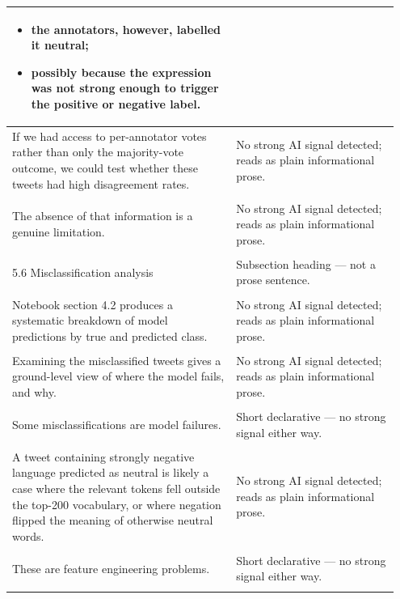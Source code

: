 \documentclass[11pt]{article}
\begin{document}
\begin{longtable}{|p{0.55\linewidth}|p{0.40\linewidth}|}
{\begin{itemize}[leftmargin=*,topsep=2pt,itemsep=1pt,parsep=0pt]
  \item the annotators, however, labelled it neutral;
  \item possibly because the expression was not strong enough to trigger the positive or negative label.
\end{itemize}}\vspace{2em} & \\
\hline
If we had access to per-annotator votes rather than only the majority-vote outcome, we could test whether these tweets had high disagreement rates. & No strong AI signal detected; reads as plain informational prose. \\[2pt]
\hline
\rule{0pt}{3.5cm} & \\
\hline
The absence of that information is a genuine limitation. & No strong AI signal detected; reads as plain informational prose. \\[2pt]
\hline
\rule{0pt}{3.5cm} & \\
\hline
5.6 Misclassification analysis & Subsection heading --- not a prose sentence. \\[2pt]
\hline
\rule{0pt}{3.5cm} & \\
\hline
Notebook section 4.2 produces a systematic breakdown of model predictions by true and predicted class. & No strong AI signal detected; reads as plain informational prose. \\[2pt]
\hline
\rule{0pt}{3.5cm} & \\
\hline
Examining the misclassified tweets gives a ground-level view of where the model fails, and why. & No strong AI signal detected; reads as plain informational prose. \\[2pt]
\hline
\rule{0pt}{3.5cm} & \\
\hline
Some misclassifications are model failures. & Short declarative --- no strong signal either way. \\[2pt]
\hline
\rule{0pt}{3.5cm} & \\
\hline
A tweet containing strongly negative language predicted as neutral is likely a case where the relevant tokens fell outside the top-200 vocabulary, or where negation flipped the meaning of otherwise neutral words. & No strong AI signal detected; reads as plain informational prose. \\[2pt]
\hline
\rule{0pt}{3.5cm} & \\
\hline
These are feature engineering problems. & Short declarative --- no strong signal either way. \\[2pt]
\hline
\rule{0pt}{3.5cm} & \\

\end{longtable}
\end{document}
